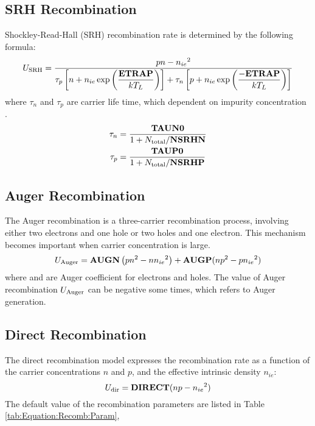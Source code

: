 \documentclass[oneside,12pt]{cgd_book}
\begin{document}
\subsection{SRH Recombination}Shockley-Read-Hall (SRH) recombination\label{SRH recombination}%
rate is determined by the following formula:
\begin{equation}
U_{\rm SRH}=\dfrac{pn-{n_{ie}}^2}{\tau_p\left[n+n_{ie}\exp\left(\dfrac{\bf
        ETRAP}{kT_L}\right)\right]+\tau_n\left[p+n_{ie}\exp\left(\dfrac{ -{\bf ETRAP}}{kT_L}\right)\right]}
\end{equation}
where $\tau_n$ and $\tau_p$ are carrier life
      time\label{Carrier life-time}, which dependent on impurity concentration
\cite{Roulston1982}.
\begin{subequations}
\begin{align}
 \tau_n  &=\frac{{\bf TAUN0}}{1+N_{\rm total}/ {\bf NSRHN}}\\
 \tau_p  &=\frac{{\bf TAUP0}}{1+N_{\rm total}/ {\bf NSRHP}}
\end{align}
\end{subequations}
\subsection{Auger Recombination}The Auger recombination\label{Auger recombination}
is a three-carrier recombination process, involving either two electrons and one hole or two
        holes and one electron. This mechanism becomes important when carrier concentration is large.
\begin{equation}
U_{\rm Auger}={\bf AUGN} \left(pn^2-n{n_{ie}}^2 \right)+{\bf AUGP}(np^2-p{{n_{ie}}^2})
\end{equation}
where  and  are Auger coefficient for electrons and
      holes. The value of Auger recombination $U_{\rm Auger}$ can be negative some times,
      which refers to Auger generation.
\par
\subsection{Direct Recombination}The direct recombination\label{Direct recombination}
model expresses the recombination rate as a function of the carrier concentrations
$n$ and $p$, and the effective intrinsic density $n_{ie}$:
\begin{equation}
U_{\rm dir}={\bf DIRECT}(np-{n_{ie}}^2)
\end{equation}
The default value of the recombination parameters are listed in
 Table \ref{tab:Equation:Recomb:Param}, %
\end{document}
